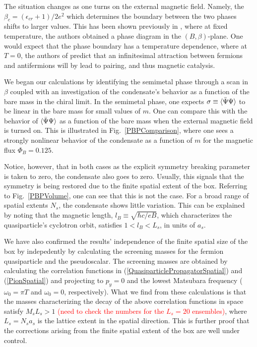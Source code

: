 \documentclass[aps,prd,twocolumn,showpacs,superscriptaddress,groupedaddress]{revtex4}  %
\begin{document}
The situation changes as one turns on the external magnetic field. Namely, the $\beta_c = (\epsilon_{cr}+1)/2e^2$ which determines the boundary between the two phases shifts to larger values. This has been shown previously in \cite{Polikarpov}, where at fixed temperature, the authors
obtained a phase diagram in the $(B, \beta)$-plane. One would expect that the phase boundary has a temperature dependence, where at $T=0$, the authors of \cite{Miransky1,Miransky2,Miransky3,Miransky4,MiranskyGraphene1,MiranskyGraphene2,MiranskyGraphene3} predict that an infinitesimal attraction between fermions and antifermions will by lead to pairing, and thus magnetic catalysis.

We began our calculations by identifying the semimetal phase through a scan in $\beta$ coupled with an investigation of the condensate's behavior as a function of the bare mass in the chiral limit. In the semimetal phase, one expects $\sigma \equiv {\langle {\bar \Psi}\Psi \rangle}$ to be linear in the bare mass for small values of $m$. 
One can compare this with the behavior of ${\langle {\bar \Psi} \Psi \rangle}$ as a function of the bare mass when the external magnetic field is turned on. This is illustrated in Fig.~\ref{PBPComparison}, where one sees a strongly nonlinear behavior of the condensate as a function of $m$ for the magnetic flux $\Phi_B = 0.125$.

Notice, however, that in both cases as the explicit symmetry breaking parameter is taken to zero, the condensate also goes to zero. Usually, this signals that the symmetry is being restored due to the finite spatial extent of the box. Referring to Fig.~\ref{PBPVolume}, one can see that this is not the
case. For a broad range of spatial extents $N_s$, the condensate shows little variation. This can be explained by noting that the magnetic length, $l_B \equiv \sqrt{\hbar c/eB}$, which characterizes the quasiparticle's cyclotron orbit, satisfies $1 < l_B < L_s$, in units of $a_s$. 

We have also confirmed the results' independence of the finite spatial size of the box by indepedently by calculating the screening
masses for the fermion quasiparticle and the pseudoscalar. The screening masses are obtained by calculating the correlation functions in (\ref{QuasiparticlePropagatorSpatial}) and (\ref{PionSpatial}) and projecting to $p_y=0$ and the lowest Matsubara frequency ($\omega_0 = \pi T$ and $\omega_0 = 0$, respectively).
What we find from these calculations is that the masses characterizing the decay of the above correlation functions in space satisfy $M_s L_s > 1$ \textcolor{red}{(need to check the numbers for the $L_s=20$ ensembles)}, where $L_s = N_s a_s$ is the  lattice extent in the spatial direction. This is further proof that the corrections arising from the finite spatial extent of the box 
are well under control.
 
\end{document}
